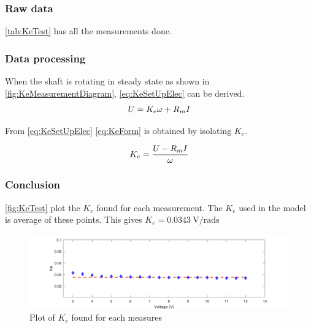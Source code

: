 \subsubsection*{Raw data}
\autoref{tab:KeTest} has all the measurements done.


\subsubsection*{Data processing}

When the shaft is rotating in steady state as shown in \autoref{fig:KeMeasurementDiagram}, \autoref{eq:KeSetUpElec} can be derived.
\begin{equation}
U=K_e\omega+R_m I \addunit{\volt}
\label{eq:KeSetUpElec}
\end{equation}
\startexplain
{}
\stopexplain

From \autoref{eq:KeSetUpElec} \autoref{eq:KeForm} is obtained by isolating $K_e$.

\begin{equation}
K_e=\frac{U-R_m I}{\omega} \addunit{\volt\per\radian\second}
\label{eq:KeForm}
\end{equation}

\subsubsection*{Conclusion}

\autoref{fig:KeTest} plot the $K_e$ found for each measurement. The $K_e$ used in the model is average of these points. This gives $K_e=\SI{0.0343}{\volt\per\radian\second}$

\begin{figure}[htbp]
	\centering
	\includegraphics[width=1.1\textwidth]{figures/appendix/Motor&GearTests/PlotKe}
	\caption{Plot of $K_e$ found for each measures}\label{fig:KeTest}
\end{figure}